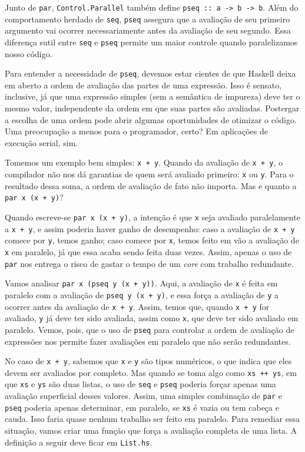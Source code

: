 \documentclass[a4paper]{article}
\begin{document}
Junto de \texttt{par}, \texttt{Control.Parallel} também define \texttt{pseq :: a -> b -> b}.
Além do comportamento herdado de \texttt{seq}, \texttt{pseq} assegura que a avaliação de seu primeiro argumento vai ocorrer necessariamente antes da avaliação de seu segundo.
Essa diferença sutil entre \texttt{seq} e \texttt{pseq} permite um maior controle quando paralelizamos nosso código.

Para entender a necessidade de \texttt{pseq}, devemos estar cientes de que Haskell deixa em aberto a ordem de avaliação das partes de uma expressão.
Isso é sensato, inclusive, já que uma expressão simples (sem a semântica de impureza) deve ter o mesmo valor, independente da ordem em que suas partes são avaliadas.
Postergar a escolha de uma ordem pode abrir algumas oportunidades de otimizar o código.
Uma preocupação a menos para o programador, certo? Em aplicações de execução serial, sim.

Tomemos um exemplo bem simples: \texttt{x + y}.
Quando da avaliação de \texttt{x + y}, o compilador não nos dá garantias de quem será avaliado primeiro: \texttt{x} ou \texttt{y}.
Para o resultado dessa soma, a ordem de avaliação de fato não importa.
Mas e quanto a \texttt{par x (x + y)}?

Quando escreve-se \texttt{par x (x + y)}, a intenção é que \texttt{x} seja avaliado paralelamente a \mbox{\texttt{x + y}}, e assim poderia haver ganho de desempenho:
caso a avaliação de \texttt{x + y} comece por \texttt{y}, temos ganho;
caso comece por \texttt{x}, temos feito em vão a avaliação de \texttt{x} em paralelo, já que essa acaba sendo feita duas vezes.
Assim, apenas o uso de \texttt{par} nos entrega o risco de gastar o tempo de um \emph{core} com trabalho redundante.

Vamos analisar \texttt{par x (pseq y (x + y))}.
Aqui, a avaliação de \texttt{x} é feita em paralelo com a avaliação de \texttt{pseq y (x + y)}, e essa força a avaliação de \texttt{y} a ocorrer antes da avaliação de \mbox{\texttt{x + y}}.
Assim, temos que, quando \texttt{x + y} for avaliado, \texttt{y} já deve ter sido avaliada, assim como \texttt{x}, que deve ter sido avaliado em paralelo.
Vemos, pois, que o uso de \texttt{pseq} para controlar a ordem de avaliação de expressões nos permite fazer avaliações em paralelo que não serão redundantes.

No caso de \texttt{x + y}, sabemos que \texttt{x} e \texttt{y} são tipos numéricos, o que indica que eles devem ser avaliados por completo.
Mas quando se toma algo como \texttt{xs ++ ys}, em que \texttt{xs} e \texttt{ys} são duas listas, o uso de \texttt{seq} e \texttt{pseq} poderia forçar apenas uma avaliação superficial desses valores.
Assim, uma simples combinação de \texttt{par} e \texttt{pseq} poderia apenas determinar, em paralelo, se \texttt{xs} é vazia ou tem cabeça e cauda.
Isso faria quase nenhum trabalho ser feito em paralelo.
Para remediar essa situação, vamos criar uma função que força a avaliação completa de uma lista.
A definição a seguir deve ficar em \texttt{List.hs}.
\end{document}
